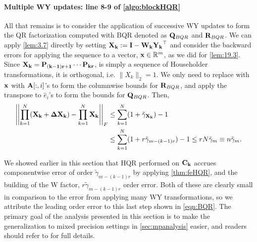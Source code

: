 \paragraph{Multiple WY updates: line 8-9 of \cref{algo:blockHQR}}
All that remains is to consider the application of successive WY updates to form the QR factorization computed with BQR denoted as $\mathbf{Q}_{BQR}$ and $\mathbf{R}_{BQR}$. 
We can apply \cref{lem:3.7} directly by setting $\mathbf{X_k}:= \mathbf{I}-\mathbf{W_k}\mathbf{Y_k}^{\top}$ and consider the backward errors for applying the sequence to a vector, $\mathbf{x}\in\mathbb{R}^{m}$, as we did for \cref{lem:19.3}. 
Since $\mathbf{X_k}=\mathbf{P_{(k-1)r+1}}\cdots\mathbf{P_{kr}}$, is simply a sequence of Householder transformations, it is orthogonal, i.e. $\|X_k\|_2=1$.
We only need to replace with $\mathbf{x}$ with $\mathbf{A}[:,i]$'s to form the columnwise bounds for $\mathbf{R}_{BQR}$, and apply the transpose to $\hat{e}_i$'s to form the bounds for $\mathbf{Q}_{BQR}$. 
Then, 
\begin{align}
\left|\left|\prod_{k=1}^N (\bb{X_k} + \bb{\Delta X_k})- \prod_{k=1}^N\bb{X_k} \right|\right|_F &\leq\sum_{k=1}^N (1+\tilde{\gamma}_{\bb{X_k}})  -1 \label{eqn:BQR-mp}\\
&\leq \sum_{k=1}^N (1+ r\tilde{\gamma}_{m-(k-1)r})-1 \leq rN\tilde{\gamma}_m \equiv n\tilde{\gamma}_m \label{eqn:BQR}.
\end{align}

We showed earlier in this section that HQR performed on $\mathbf{C_k}$ accrues componentwise error of order $\tilde{\gamma}_{m-(k-1)r}$ by applying \cref{thm:feHQR}, and the building of the W factor, $r\tilde{\gamma}_{m-(k-1)r}$ order error.
Both of these are clearly small in comparison to the error from applying many WY transformations, so we attribute the leading order error to this last step shown in \cref{eqn:BQR}.
The primary goal of the analysis presented in this section is to make the generalization to mixed precision settings in \cref{sec:mpanalysis} easier, and readers should refer to \cite{golub2013matrix,Higham2002} for full details.
